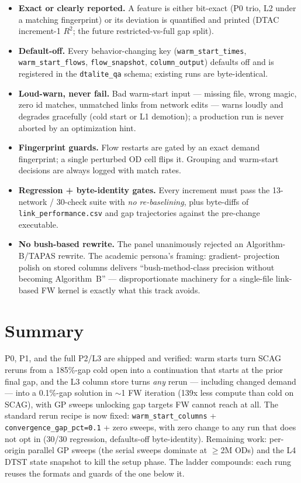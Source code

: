 \documentclass[10pt]{article}
\newcommand{\code}[1]{\texttt{#1}}
\begin{document}
\begin{itemize}[nosep]
  \item \textbf{Exact or clearly reported.} A feature is either bit-exact
    (P0 trio, L2 under a matching fingerprint) or its deviation is quantified
    and printed (DTAC increment-1 $R^2$; the future restricted-vs-full gap split).
  \item \textbf{Default-off.} Every behavior-changing key
    (\code{warm\_start\_times}, \code{warm\_start\_flows}, \code{flow\_snapshot},
    \code{column\_output}) defaults off and is registered in the
    \code{dtalite\_qa} schema; existing runs are byte-identical.
  \item \textbf{Loud-warn, never fail.} Bad warm-start input --- missing file,
    wrong magic, zero id matches, unmatched links from network edits --- warns
    loudly and degrades gracefully (cold start or L1 demotion); a production
    run is never aborted by an optimization hint.
  \item \textbf{Fingerprint guards.} Flow restarts are gated by an exact
    demand fingerprint; a single perturbed OD cell flips it. Grouping and
    warm-start decisions are always logged with match rates.
  \item \textbf{Regression + byte-identity gates.} Every increment must pass
    the 13-network / 30-check suite with \emph{no re-baselining}, plus
    byte-diffs of \code{link\_performance.csv} and gap trajectories against the
    pre-change executable.
  \item \textbf{No bush-based rewrite.} The panel unanimously rejected an
    Algorithm-B/TAPAS rewrite. The academic persona's framing: gradient-
    projection polish on stored columns delivers ``bush-method-class precision
    without becoming Algorithm~B'' --- disproportionate machinery for a
    single-file link-based FW kernel is exactly what this track avoids.
\end{itemize}

\section*{Summary}

P0, P1, and the full P2/L3 are shipped and verified: warm starts turn SCAG
reruns from a 185\%-gap cold open into a continuation that starts at the prior
final gap, and the L3 column store turns \emph{any} rerun --- including changed
demand --- into a 0.1\%-gap solution in $\sim$1 FW iteration (139x less compute
than cold on SCAG), with GP sweeps unlocking gap targets FW cannot reach at
all. The standard rerun recipe is now fixed: \code{warm\_start\_columns} +
\code{convergence\_gap\_pct=0.1} + zero sweeps, with zero change to any run
that does not opt in (30/30 regression, defaults-off byte-identity). Remaining
work: per-origin parallel GP sweeps (the serial sweeps dominate at
$\geq$2M ODs) and the L4 DTST state snapshot to kill the setup phase. The
ladder compounds: each rung reuses the formats and guards of the one below it.
\end{document}
